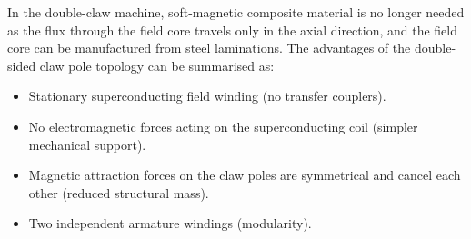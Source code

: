 \documentclass[12pt]{IET02}
\begin{document}
In the double-claw machine, soft-magnetic composite material is no longer needed as the flux through the field core travels only in the axial direction, and the field core can be manufactured from steel laminations.
The advantages of the double-sided claw pole topology can be summarised as:

\begin{itemize}
  \item Stationary superconducting field winding (no transfer couplers).
  \item No electromagnetic forces acting on the superconducting coil (simpler mechanical support).
  \item Magnetic attraction forces on the claw poles are symmetrical and cancel each other (reduced structural mass).
  \item Two independent armature windings (modularity).
\end{itemize}

\vspace{0.5pc}
\end{document}
